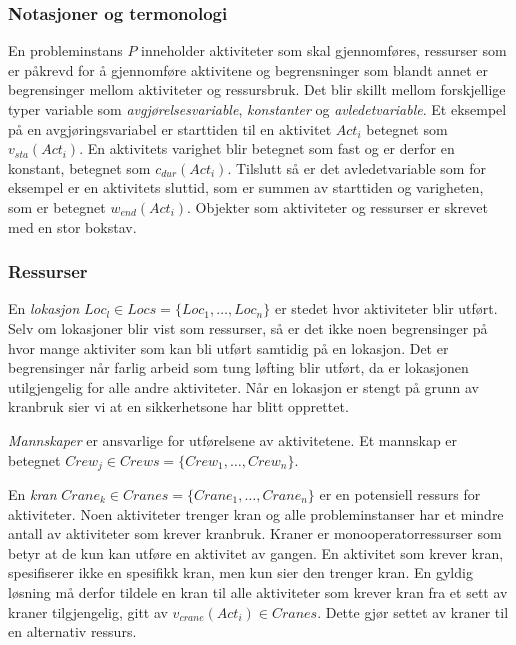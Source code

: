 \subsubsection{Notasjoner og termonologi}
En probleminstans $ P $ inneholder aktiviteter som skal gjennomføres, ressurser som er påkrevd for å gjennomføre aktivitene og begrensninger som blandt annet er begrensinger mellom aktiviteter og ressursbruk. Det blir skillt mellom forskjellige typer variable som \textit{avgjørelsesvariable}, \textit{konstanter} og \textit{avledetvariable}. Et eksempel på en avgjøringsvariabel er starttiden til en aktivitet $ Act_{i} $ betegnet som $ v_{sta}(Act_{i}) $. En aktivitets varighet blir betegnet som fast og er derfor en konstant, betegnet som $ c_{dur}(Act_{i}) $. Tilslutt så er det avledetvariable som for eksempel er en aktivitets sluttid, som er summen av starttiden og varigheten, som er betegnet $ w_{end}(Act_{i}) $. Objekter som aktiviteter og ressurser er skrevet med en stor bokstav.

\subsubsection{Ressurser}
En \textit{lokasjon} $ Loc_{l} \in Locs = \{ Loc_{1},\dots,Loc_{n} \} $ er stedet hvor aktiviteter blir utført. Selv om lokasjoner blir vist som ressurser, så er det ikke noen begrensinger på hvor mange aktiviter som kan bli utført samtidig på en lokasjon. Det er begrensinger når farlig arbeid som tung løfting blir utført, da er lokasjonen utilgjengelig for alle andre aktiviteter. Når en lokasjon er stengt på grunn av kranbruk sier vi at en sikkerhetsone har blitt opprettet.

\textit{Mannskaper} er ansvarlige for utførelsene av aktivitetene. Et mannskap er betegnet $ Crew_{j} \in Crews = \{ Crew_{1},\dots,Crew_{n} \} $.

En \textit{kran} $ Crane_{k} \in Cranes = \{ Crane_{1},\dots,Crane_{n} \} $ er en potensiell ressurs for aktiviteter. Noen aktiviteter trenger kran og alle probleminstanser har et mindre antall av aktiviteter som krever kranbruk. Kraner er monooperatorressurser  som betyr at de kun kan utføre en aktivitet av gangen. En aktivitet som krever kran, spesifiserer ikke en spesifikk kran, men kun sier den trenger kran. En gyldig løsning må derfor tildele en kran til alle aktiviteter som krever kran fra et sett av kraner tilgjengelig, gitt av $ v_{crane}(Act_{i}) \in Cranes $. Dette gjør settet av kraner til en alternativ ressurs.

